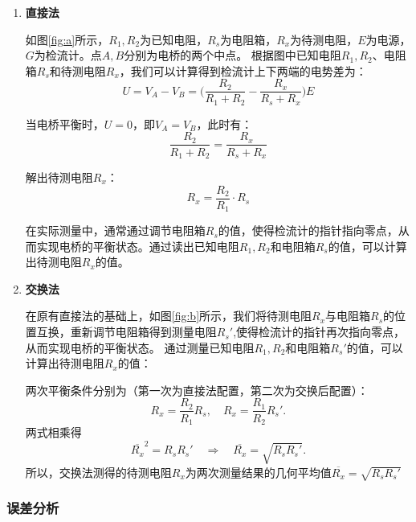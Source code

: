 \documentclass[]{../template/Report}%
\begin{document}
\begin{enumerate}[label=(\arabic*)]
\item \textbf{直接法}

如图\ref{fig:a}所示，$R_1,R_2$为已知电阻，$R_s$为电阻箱，$R_x$为待测电阻，$E$为电源，$G$为检流计。点$A,B$分别为电桥的两个中点。
根据图中已知电阻$R_1,R_2$、电阻箱$R_s$和待测电阻$R_x$，我们可以计算得到检流计上下两端的电势差为：
\begin{equation}
    U=V_A-V_B=\Big(\frac{R_2}{R_1+R_2}-\frac{R_x}{R_s+R_x}\Big)E
\end{equation}

当电桥平衡时，$U=0$，即$V_A=V_B$，此时有：
\begin{equation}
    \frac{R_2}{R_1+R_2}=\frac{R_x}{R_s+R_x}
\end{equation}

解出待测电阻$R_x$：
\begin{equation}
    R_x=\frac{R_2}{R_1}\cdot R_s
\end{equation}

在实际测量中，通常通过调节电阻箱$R_s$的值，使得检流计的指针指向零点，从而实现电桥的平衡状态。通过读出已知电阻$R_1,R_2$和电阻箱$R_s$的值，可以计算出待测电阻$R_x$的值。

\item \textbf{交换法}

在原有直接法的基础上，如图\ref{fig:b}所示，我们将待测电阻$R_x$与电阻箱$R_s$的位置互换，重新调节电阻箱得到测量电阻$R_s'$,使得检流计的指针再次指向零点，从而实现电桥的平衡状态。
通过测量已知电阻$R_1,R_2$和电阻箱$R_s'$的值，可以计算出待测电阻$R_x$的值：

两次平衡条件分别为（第一次为直接法配置，第二次为交换后配置）：
\begin{equation}
R_x=\frac{R_2}{R_1}R_s,\quad
R_x=\frac{R_1}{R_2}R_s'.
\end{equation}
两式相乘得
\begin{equation}
\overline{R_x}^2=R_sR_s'\quad\Rightarrow\quad \overline{R_x}=\sqrt{R_sR_s'}.
\end{equation}
所以，交换法测得的待测电阻$R_x$为两次测量结果的几何平均值$\overline{R_x}=\sqrt{R_sR_s'}$
\end{enumerate}

\subsubsection{误差分析}
\end{document}
